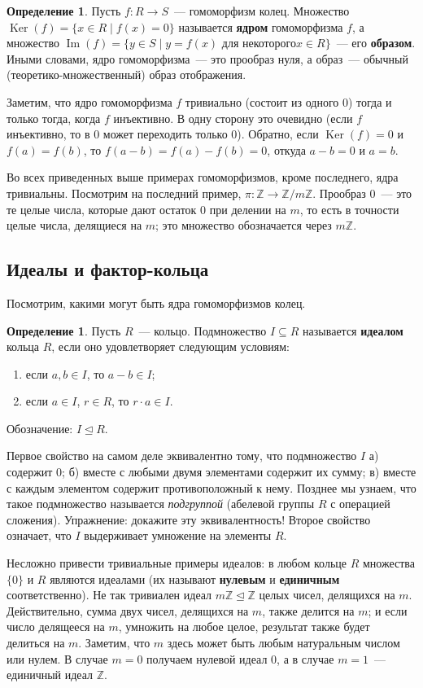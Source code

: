 \documentclass[a4paper,11pt]{scrartcl}
\theoremstyle{plain}
\theoremstyle{definition}
\newtheorem{definition}[theorem]{Определение}
\newcommand\dfn[1]{\textbf{#1}}
\newcommand\mb{\mathbb}
\newcommand\trleq{\trianglelefteq}
\newcommand{\Img}{\operatorname{Im}}
\newcommand\Ker{\operatorname{Ker}}
\begin{document}
\begin{definition}
Пусть $f\colon R\to S$~--- гомоморфизм колец. Множество
$\Ker(f)=\{x\in R\mid f(x)=0\}$ называется \dfn{ядром} гомоморфизма
$f$, а множество $\Img(f)=\{y\in S\mid y=f(x)\text{ для некоторого
}x\in R\}$~--- его \dfn{образом}. Иными словами, ядро гомоморфизма~---
это прообраз нуля, а образ~--- обычный (теоретико-множественный) образ
отображения.
\end{definition}
Заметим, что ядро гомоморфизма $f$ тривиально (состоит из одного 0)
тогда и только тогда, когда $f$ инъективно. В одну сторону это
очевидно (если $f$ инъективно, то в 0 может переходить только
0). Обратно, если $\Ker(f)=0$ и $f(a)=f(b)$, то $f(a-b)=f(a)-f(b)=0$,
откуда $a-b=0$ и $a=b$.

Во всех приведенных выше примерах гомоморфизмов, кроме последнего,
ядра тривиальны. Посмотрим на последний пример, $\pi\colon\mb Z\to\mb
Z/m\mb Z$. Прообраз 0~--- это те целые числа, которые дают остаток 0
при делении на $m$, то есть в точности целые числа, делящиеся на $m$;
это множество обозначается через $m\mb Z$.

\subsection{Идеалы и фактор-кольца}

Посмотрим, какими могут быть ядра гомоморфизмов колец.
\begin{definition}
Пусть $R$~--- кольцо.
Подмножество $I\subseteq R$ называется \dfn{идеалом} кольца $R$, если
оно удовлетворяет следующим условиям:
\begin{enumerate}
\item если $a,b\in I$, то $a-b\in I$;
\item если $a\in I$, $r\in R$, то $r\cdot a\in I$.
\end{enumerate}
Обозначение: $I\trleq R$.
\end{definition}
Первое свойство на самом деле эквивалентно тому, что подмножество $I$
а) содержит 0; б) вместе с любыми двумя элементами содержит их сумму;
в) вместе с каждым элементом содержит противоположный к нему. Позднее
мы узнаем, что такое подмножество называется \emph{подгруппой}
(абелевой группы $R$ с операцией сложения). Упражнение: докажите эту
эквивалентность!
Второе свойство означает, что $I$ выдерживает умножение на элементы
$R$.

Несложно привести тривиальные примеры идеалов: в любом кольце $R$
множества $\{0\}$ и $R$ являются идеалами (их называют \dfn{нулевым} и
\dfn{единичным} соответственно). Не так тривиален идеал
$m\mb Z\trleq \mb Z$ целых чисел, делящихся на $m$.
Действительно, сумма двух чисел, делящихся на $m$, также делится
на $m$; и если число делящееся на $m$, умножить на любое целое,
результат также будет делиться на $m$. Заметим, что $m$ здесь может
быть любым натуральным числом или нулем. В случае $m=0$ получаем
нулевой идеал $0$, а в случае $m=1$~--- единичный идеал $\mb Z$.
\end{document}
